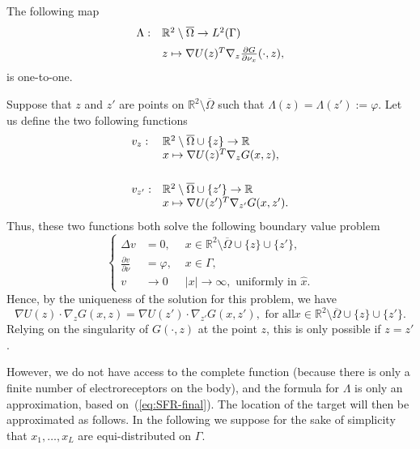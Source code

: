 \begin{lemma}\label{lemma:one-to-one}The following map
\[\begin{array}{ll}
\Lambda: &\mathbb{R}^{2}\setminus\overline{\Omega} \rightarrow  L^{2}(\Gamma)\\
\nm &z \mapsto  \nabla U(z)^T \nabla_{z}\frac{\partial
G}{\partial\nu_{x}}(\cdot,z),
\end{array}
\]
is one-to-one.\end{lemma}

\proof

Suppose that $z$ and $z'$ are points on
$\mathbb{R}^{2}\setminus\overline{\Omega}$ such that
$\Lambda(z)=\Lambda(z'):=\varphi$. Let us define the two following
functions
\[
\begin{array}{ll}v_{z}: &\mathbb{R}^{2}\setminus\overline{\Omega}\cup\{z\} \rightarrow \mathbb{R}\\
& x \mapsto  \nabla U(z)^T \nabla_{z}G(x,z),
\\
\nm \nm \nm
v_{z'}: & \mathbb{R}^{2}\setminus\overline{\Omega}\cup\{z'\} \rightarrow  \mathbb{R}\\
& x \mapsto  \nabla U(z')^T \nabla_{z'}G(x,z').
\end{array}
\]
Thus, these two functions both solve the following boundary value
problem
\[
\left\{ \begin{alignedat}{2}\Delta v & =0, & \,\, x\in\mathbb{R}^{2}\setminus\overline{\Omega}\cup\{z\}\cup\{z'\},\\
\frac{\partial v}{\partial\nu} & =\varphi, & \,\, x\in\Gamma,\\
v & \rightarrow0 & \,\,\left|x\right|\rightarrow\infty,\text{ uniformly in }\hat{x}.
\end{alignedat}
\right.
\]
Hence, by the uniqueness of the solution for this problem, we have
\[
\nabla U(z)\cdot\nabla_{z}G(x,z)=\nabla
U(z')\cdot\nabla_{z'}G(x,z'),\mbox{ for all
}x\in\mathbb{R}^{2}\setminus\overline{\Omega}\cup\{z\}\cup\{z'\}.
\]
Relying on the singularity of $G(\cdot,z)$ at the point $z$, this
is only possible if $z=z'$.

\cqfd

However, we do not have access to the complete function (because
there is only a finite number of electroreceptors on the body),
and the formula for $\Lambda$ is only an approximation, based
on~(\ref{eq:SFR-final}). The location of the target will then be
approximated as follows. In the following we suppose for the sake
of simplicity that $x_1,\ldots, x_L$ are equi-distributed on
$\Gamma$.

